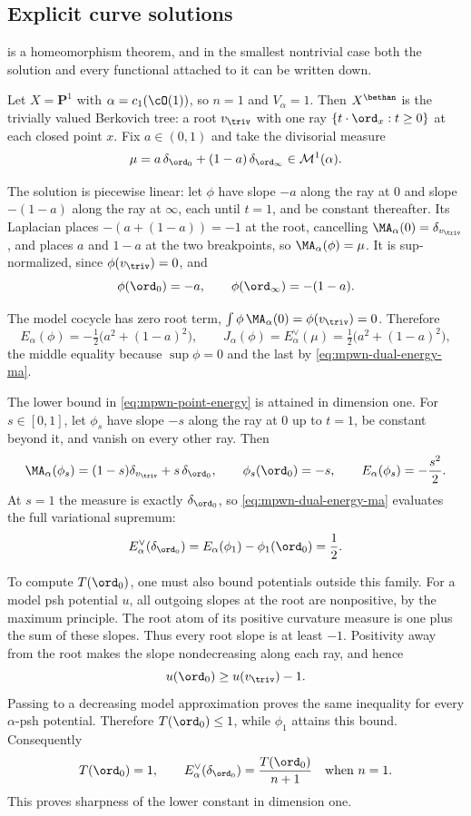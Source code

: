 \subsection{Explicit curve solutions}
\label{subsec:mpwn-curve-solutions}

\begin{example}
\label{ex:mpwn-p1-cy}
 is a homeomorphism theorem, and in the smallest
nontrivial case both the solution and every functional attached to it can
be written down.

Let $X=\mathbf P^1$ with $\alpha=c_1(\cO(1))$, so $n=1$ and
$V_\alpha=1$.  Then $X^{\bethan}$ is the trivially valued Berkovich
tree: a root $v_{\triv}$ with one ray $\{t\cdot\ord_x:t\geq0\}$ at each
closed point $x$.  Fix $a\in(0,1)$ and take the divisorial measure
\[
 \mu=a\,\delta_{\ord_0}+(1-a)\,\delta_{\ord_\infty}\in\mathcal M^1(\alpha).
\]

The solution is piecewise linear: let $\phi$ have slope $-a$ along the
ray at $0$ and slope $-(1-a)$ along the ray at $\infty$, each until
$t=1$, and be constant thereafter.  Its Laplacian places
$-(a+(1-a))=-1$ at the root, cancelling
$\MA_\alpha(0)=\delta_{v_{\triv}}$, and places $a$ and $1-a$ at the
two breakpoints, so $\MA_\alpha(\phi)=\mu$.  It is sup-normalized, since
$\phi(v_{\triv})=0$, and
\[
 \phi(\ord_0)=-a,\qquad \phi(\ord_\infty)=-(1-a).
\]

The model cocycle has zero root term,
$\int\phi\,\MA_\alpha(0)=\phi(v_{\triv})=0$. Therefore
\[
 E_\alpha(\phi)=-\tfrac12\bigl(a^2+(1-a)^2\bigr),
 \qquad
 J_\alpha(\phi)=E_\alpha^\vee(\mu)=\tfrac12\bigl(a^2+(1-a)^2\bigr),
\]
the middle equality because $\sup\phi=0$ and the last by
\eqref{eq:mpwn-dual-energy-ma}.

The lower bound in \eqref{eq:mpwn-point-energy} is attained in
dimension one.  For $s\in[0,1]$, let $\phi_s$ have slope $-s$
along the ray at $0$ up to $t=1$, be constant beyond it, and
vanish on every other ray.  Then
\[
 \MA_\alpha(\phi_s)
       =(1-s)\delta_{v_{\triv}}+s\,\delta_{\ord_0},
 \qquad
 \phi_s(\ord_0)=-s,
 \qquad E_\alpha(\phi_s)=-\frac{s^2}{2}.
\]
At $s=1$ the measure is exactly $\delta_{\ord_0}$, so
\eqref{eq:mpwn-dual-energy-ma} evaluates the full variational
supremum:
\[
 E_\alpha^\vee(\delta_{\ord_0})
       =E_\alpha(\phi_1)-\phi_1(\ord_0)=\frac12.
\]

To compute $T(\ord_0)$, one must also bound potentials outside
this family.  For a model psh potential $u$, all outgoing slopes
at the root are nonpositive, by the maximum principle.  The
root atom of its positive curvature measure is one plus the
sum of these slopes.  Thus every root slope is at least $-1$.
Positivity away from the root makes the slope nondecreasing
along each ray, and hence
\[
                    u(\ord_0)\geq u(v_{\triv})-1.
\]
Passing to a decreasing model approximation proves the same
inequality for every $\alpha$-psh potential.  Therefore
$T(\ord_0)\leq1$, while $\phi_1$ attains this bound.
Consequently
\[
       T(\ord_0)=1,\qquad
       E_\alpha^\vee(\delta_{\ord_0})
                         =\frac{T(\ord_0)}{n+1}
                         \quad\text{when }n=1.
\]
This proves sharpness of the lower constant in dimension one.


\end{example}
